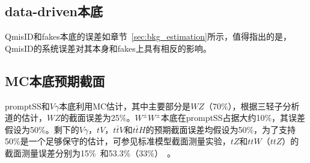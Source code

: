 \subsection{data-driven本底}
QmisID和fakes本底的误差如章节~\ref{sec:bkg_estimation}所示，值得指出的是，QmisID的系统误差对其本身和fakes上具有相反的影响。

\subsection{MC本底预期截面}
promptSS和$V\gamma$本底利用MC估计，其中主要部分是$WZ$（70\%），根据三轻子分析道的估计，$WZ$的截面误差为25\%。$W^{\pm}W^{\pm}$本底在promptSS占据大约10\%，其误差
假设为50\%。剩下的$V\gamma$，$tV$，$t\bar{t}V$和$t\bar{t}H$的预期截面误差均假设为50\%，为了支持50\%是一个足够保守的估计，可参见标准模型截面测量实验，$tZ$和$ttW$（$ttZ$）的
截面测量误差分别为15\%~\cite{xsection_WZ}和53.3\%（33\%）~\cite{xsection_ttV}。


